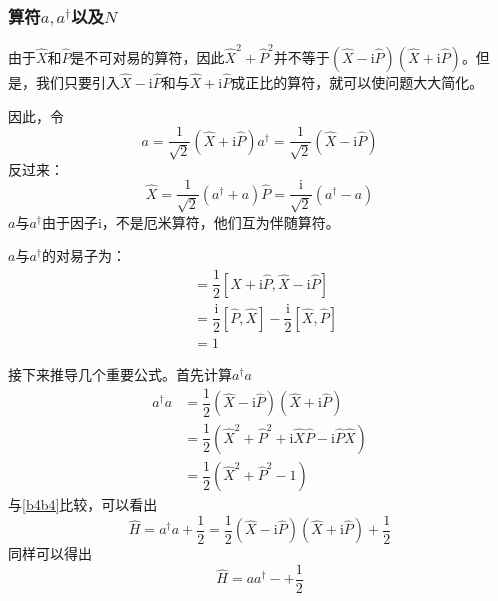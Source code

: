 \documentclass[]{article}
\begin{document}
\subsubsection{算符$a,a^\dagger$以及$N$}
由于$\widehat{X}$和$\widehat{P}$是不可对易的算符，因此$\widehat{X}^2+\widehat{P}^2$并不等于$(\widehat{X}-\mathrm{i}\widehat{P})(\widehat{X}+\mathrm{i}\widehat{P})$。但是，我们只要引入$\widehat{X}-\mathrm{i}\widehat{P}$和与$\widehat{X}+\mathrm{i}\widehat{P}$成正比的算符，就可以使问题大大简化。\par 
因此，令
\begin{subequations}
	\begin{equation}
		a=\dfrac{1}{\sqrt{2}}(\widehat{X}+\mathrm{i}\widehat{P})
	\end{equation}
	\begin{equation}
		a^\dagger=\dfrac{1}{\sqrt{2}}(\widehat{X}-\mathrm{i}\widehat{P})
	\end{equation}
\label{b7b7}
\end{subequations}
反过来：
\begin{subequations}
	\begin{equation}
		\widehat{X}=\dfrac{1}{\sqrt{2}}(a^\dagger+a)
	\end{equation}
	\begin{equation}
		\widehat{P}=\dfrac{\mathrm{i}}{\sqrt{2}}(a^\dagger-a)
	\end{equation}
\end{subequations}
$a$与$a^\dagger$由于因子i，不是厄米算符，他们互为伴随算符。\par 
$a$与$a^\dagger$的对易子为：
\begin{align}
	[a,a^\dagger]&=\dfrac{1}{2}[\widehat{X}+\mathrm{i}\widehat{P},\widehat{X}-\mathrm{i}\widehat{P}]\nonumber\\
				 &=\dfrac{\mathrm{i}}{2}[\widehat{P},\widehat{X}]-\dfrac{\mathrm{i}}{2}[\widehat{X},\widehat{P}]\nonumber\\
				 &=1
				 \label{b9b9}
\end{align}

接下来推导几个重要公式。首先计算$a^\dagger a$
\begin{align}
	a^\dagger a&=\dfrac{1}{2}(\widehat{X}-\mathrm{i}\widehat{P})(\widehat{X}+\mathrm{i}\widehat{P})\nonumber\\
	 &=\dfrac{1}{2}(\widehat{X}^2+\widehat{P}^2+\mathrm{i}\widehat{X}\widehat{P}-\mathrm{i}\widehat{P}\widehat{X})\nonumber\\
	 &=\dfrac{1}{2}(\widehat{X}^2+\widehat{P}^2-1)
\end{align}
与\eqref{b4b4}比较，可以看出
\begin{equation}
	\widehat{H}=a^\dagger a+\dfrac{1}{2}=\dfrac{1}{2}(\widehat{X}-\mathrm{i}\widehat{P})(\widehat{X}+\mathrm{i}\widehat{P})+\dfrac{1}{2}
	\label{b11b11}
\end{equation}
同样可以得出
\begin{equation}
	\widehat{H}=aa^\dagger-+\dfrac{1}{2}
\end{equation}
\end{document}
